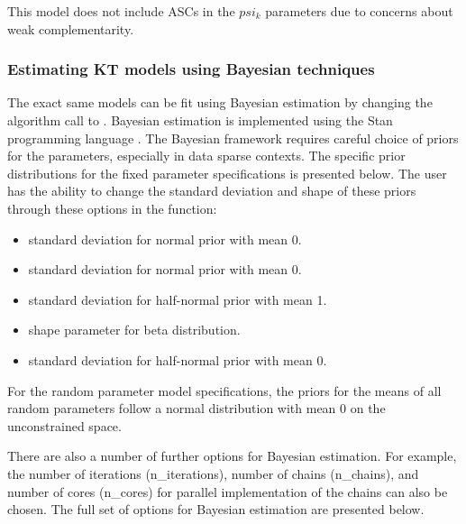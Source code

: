This model does not include ASCs in the \(psi_k\) parameters due to
concerns about weak complementarity.

\hypertarget{estimating-kt-models-using-bayesian-techniques}{%
\subsubsection{Estimating KT models using Bayesian
techniques}\label{estimating-kt-models-using-bayesian-techniques}}

The exact same models can be fit using Bayesian estimation by changing
the algorithm call to . Bayesian estimation is implemented
using the Stan programming language \citep{carpenterstan2017}. The
Bayesian framework requires careful choice of priors for the parameters,
especially in data sparse contexts. The specific prior distributions for
the fixed parameter specifications is presented below. The user has the
ability to change the standard deviation and shape of these priors
through these options in the  function:

\begin{itemize}
\tightlist
\item
   standard deviation for normal prior with mean 0.
\item
   standard deviation for normal prior with mean 0.
\item
   standard deviation for half-normal prior with
  mean 1.
\item
   shape parameter for beta distribution.
\item
   standard deviation for half-normal prior with
  mean 0.
\end{itemize}

For the random parameter model specifications, the priors for the means
of all random parameters follow a normal distribution with mean 0 on the
unconstrained space.

There are also a number of further options for Bayesian estimation. For
example, the number of iterations (n\_iterations), number of chains
(n\_chains), and number of cores (n\_cores) for parallel implementation
of the chains can also be chosen. The full set of options for Bayesian
estimation are presented below.

